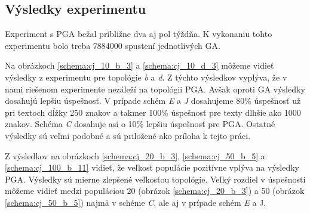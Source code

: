\clearpage
\subsection{Výsledky experimentu}
Experiment s PGA bežal približne dva aj pol týždňa. K vykonaniu tohto experimentu bolo treba 7884000 spustení jednotlivých GA.

Na obrázkoch \ref{schema:cj_10_b_3} a \ref{schema:cj_10_d_3} môžeme vidieť výsledky z experimentu pre topológie \textit{b} a \textit{d}.
Z týchto výsledkov vyplýva, že v nami riešenom experimente nezáleží na topológii PGA. Avšak oproti GA výsledky dosahujú lepšiu úspešnosť. V prípade schém \textit{E} a \textit{J} dosahujeme 80\% úspešnosť už pri textoch dĺžky 250 znakov a takmer 100\% úspešnosť pre texty dlhšie ako 1000 znakov. Schéma \textit{C} dosahuje asi o 10\%
lepšiu úspešnosť pre PGA. Ostatné výsledky sú veľmi podobné a sú priložené ako príloha k tejto práci.

Z výsledkov na obrázkoch \ref{schema:cj_20_b_3}, \ref{schema:cj_50_b_5} a \ref{schema:cj_100_b_11} vidieť, že veľkosť populácie pozitívne vplýva na výsledky PGA.
Výsledky sú mierne zlepšené veľkosťou topológie. Veľký rozdiel v úspešnosti môžeme vidieť medzi populáciou 20 (obrázok \ref{schema:cj_20_b_3}) a 50 (obrázok \ref{schema:cj_50_b_5}) najmä v schéme \textit{C}, ale aj v prípade schém \textit {E} a {J}.








